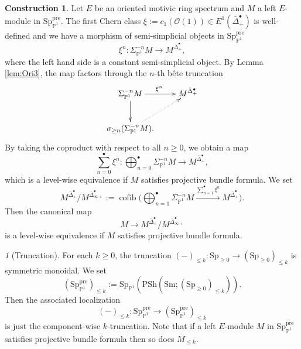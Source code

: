 \documentclass{amsart}
\theoremstyle{plain}
\theoremstyle{definition}
\newtheorem{construction}[theorem]{Construction}
\theoremstyle{remark}
\newtheorem{p}[theorem]{}
\numberwithin{equation}{theorem}
\newcommand{\mcal}[1]{\mathcal{#1}}
\newcommand{\PSh}{\mathrm{PSh}}
\newcommand{\Sm}{\mathrm{Sm}}
\newcommand{\Sp}{\mathrm{Sp}}
\newcommand{\pre}{\mathrm{pre}}
\newcommand{\SigmaP}{\Sigma_{\mathbb{P}^1}}
\newcommand{\SpP}{\mathrm{Sp}_{\mathbb{P}^1}}
\newcommand{\cofib}{\operatorname{cofib}}
\begin{document}
\begin{construction}\label{cons:Lif}
Let $E$ be an oriented motivic ring spectrum and $M$ a left $E$-module in $\SpP^\pre$.
The first Chern class $\xi:=c_1(\mcal{O}(1))\in E^1(\bar{\Delta}^\bullet_+)$ is well-defined and we have a morphism of semi-simplicial objects in $\SpP^\pre$
\[
	\xi^n \colon \SigmaP^{-n}M \to M^{\bar{\Delta}^\bullet_+},
\]
where the left hand side is a constant semi-simplicial object.
By Lemma \ref{lem:Ori3}, the map factors through the $n$-th b\^ete truncation
\[
\xymatrix{
	\SigmaP^{-n}M \ar[r]^{\xi^n} \ar[d] & M^{\bar{\Delta}^\bullet_+} \\
	\sigma_{\ge n}(\SigmaP^{-n}M). \ar@{.>}[ru] &
}
\]
By taking the coproduct with respect to all $n\ge 0$, we obtain a map
\[
	\sum_{n=0}^\bullet \xi^n \colon \bigoplus_{n=0}^\bullet \SigmaP^{-n}M \to M^{\bar{\Delta}^\bullet_+},
\]
which is a level-wise equivalence if $M$ satisfies projective bundle formula.
We set
\[
	M^{\bar{\Delta}^\bullet_+}/M^{\bar{\Delta}^\bullet_{\infty+}}
	:= \cofib\biggl( \bigoplus_{n=1}^\bullet \SigmaP^{-n}M \xrightarrow{\sum_{n=1}^\bullet \xi^n} M^{\bar{\Delta}^\bullet_+} \biggr).
\]
Then the canonical map
\[
	M \to M^{\bar{\Delta}^\bullet_+}/M^{\bar{\Delta}^\bullet_{\infty+}}
\]
is a level-wise equivalence if $M$ satisfies projective bundle formula.
\end{construction}

\begin{p}[Truncation]
For each $k\ge 0$, the truncation $(-)_{\le k}\colon\Sp_{\ge 0}\to(\Sp_{\ge 0})_{\le k}$ is symmetric monoidal.
We set
\[
	(\SpP^\pre)_{\le k} := \SpP(\PSh(\Sm;(\Sp_{\ge 0})_{\le k})).
\]
Then the associated localization
\[
	(-)_{\le k} \colon \SpP^\pre \to (\SpP^\pre)_{\le k}
\]
is just the component-wise $k$-truncation.
Note that if a left $E$-module $M$ in $\SpP^\pre$ satisfies projective bundle formula then so does $M_{\le k}$.
\end{p}
\end{document}
